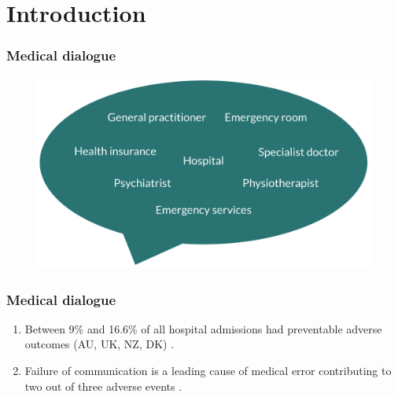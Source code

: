 
\section{Introduction}

\begin{frame}
    \frametitle{Medical dialogue}
    \begin{figure}
        \centering
        \includegraphics[width=0.7\paperwidth]{figures/speech_bubble.pdf}
    \end{figure}
\end{frame}

\begin{frame}
    \frametitle{Medical dialogue}
    \begin{enumerate}
        \item Between 9\% and 16.6\% of all hospital admissions had preventable adverse outcomes (AU, UK, NZ, DK) \cite{carver_medical_2024}.
        \item Failure of communication is a leading cause of medical error contributing to two out of three adverse events \cite{starmer_changes_2014}.
    \end{enumerate}

    

\end{frame}

